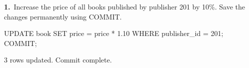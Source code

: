 \noindent\begin{minipage}{\linewidth}
\begingroup{}
{\fontsize{14}{17}\selectfont\textbf{1.}}\ Increase the price of all books published by publisher 201 by 10\%. Save the changes permanently using COMMIT.\par
\endgroup\vspace{12pt}


\begin{sqlcode}
UPDATE book SET price = price * 1.10
WHERE publisher_id = 201;
COMMIT;
\end{sqlcode}

\vspace{18pt}


\begin{sqlout}[fontsize=\small]
3 rows updated.
Commit complete.
\end{sqlout}
\end{minipage}\par\vspace{24pt}

